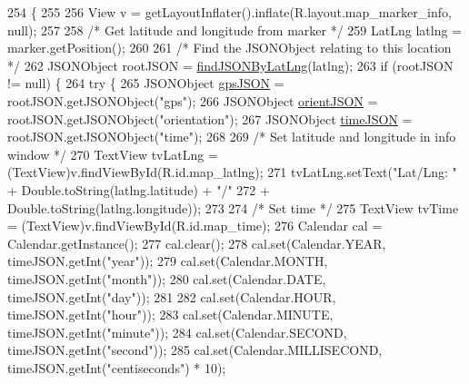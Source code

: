 \begin{DoxyCode}
254                                                    \{
255 
256             View v =  getLayoutInflater().inflate(R.layout.map\_marker\_info, null);
257 
258             \textcolor{comment}{/* Get latitude and longitude from marker */}
259             LatLng latlng = marker.getPosition();
260 
261             \textcolor{comment}{/* Find the JSONObject relating to this location */}
262             JSONObject rootJSON = \hyperlink{class_android_app_1_1_maps_activity_a18364d9334710362b1e6c39502353927}{findJSONByLatLng}(latlng);
263             \textcolor{keywordflow}{if} (rootJSON != null) \{
264                 \textcolor{keywordflow}{try} \{
265                     JSONObject \hyperlink{logging-device_8ino_a548727e041a5cd3db91bdbd0ccd71e30}{gpsJSON} = rootJSON.getJSONObject(\textcolor{stringliteral}{"gps"});
266                     JSONObject \hyperlink{logging-device_8ino_ae8e95a76df2aaa373792e5b744a6bb73}{orientJSON} = rootJSON.getJSONObject(\textcolor{stringliteral}{"orientation"});
267                     JSONObject \hyperlink{logging-device_8ino_acc172a29cb5ff709b48b650d9fb6503c}{timeJSON} = rootJSON.getJSONObject(\textcolor{stringliteral}{"time"});
268 
269                     \textcolor{comment}{/* Set latitude and longitude in info window */}
270                     TextView tvLatLng = (TextView)v.findViewById(R.id.map\_latlng);
271                     tvLatLng.setText(\textcolor{stringliteral}{"Lat/Lng: "} + Double.toString(latlng.latitude) + \textcolor{stringliteral}{"/"}
272                             + Double.toString(latlng.longitude));
273 
274                     \textcolor{comment}{/* Set time */}
275                     TextView tvTime = (TextView)v.findViewById(R.id.map\_time);
276                     Calendar cal = Calendar.getInstance();
277                     cal.clear();
278                     cal.set(Calendar.YEAR, timeJSON.getInt(\textcolor{stringliteral}{"year"}));
279                     cal.set(Calendar.MONTH, timeJSON.getInt(\textcolor{stringliteral}{"month"}));
280                     cal.set(Calendar.DATE, timeJSON.getInt(\textcolor{stringliteral}{"day"}));
281 
282                     cal.set(Calendar.HOUR, timeJSON.getInt(\textcolor{stringliteral}{"hour"}));
283                     cal.set(Calendar.MINUTE, timeJSON.getInt(\textcolor{stringliteral}{"minute"}));
284                     cal.set(Calendar.SECOND, timeJSON.getInt(\textcolor{stringliteral}{"second"}));
285                     cal.set(Calendar.MILLISECOND, timeJSON.getInt(\textcolor{stringliteral}{"centiseconds"}) * 10);

\end{DoxyCode}
